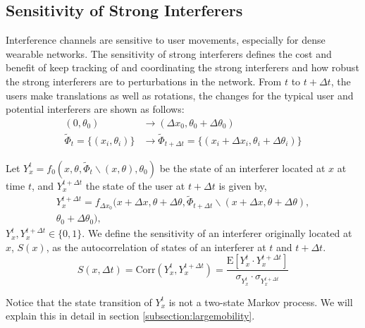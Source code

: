 \documentclass[10pt, conference, letterpaper]{IEEEtran}
\begin{document}
\subsection{Sensitivity of Strong Interferers}
Interference channels are sensitive to user movements, especially for dense wearable networks. The sensitivity of strong interferers defines the cost and benefit of keep tracking of and coordinating the strong interferers and how robust the strong interferers are to perturbations in the network. From $t$ to $t+\Delta t$, the users make translations as well as rotations, the changes for the typical user and potential interferers are shown as follows:
\begin{equation*}
\begin{split}
(0,\theta_0)&\rightarrow(\Delta x_0, \theta_0 + \Delta\theta_0) \\
\tilde{\Phi}_{t}=\{(x_i, \theta_i)\}&\rightarrow\tilde{\Phi}_{t+\Delta t}=\{(x_i+\Delta x_i, \theta_i + \Delta\theta_i)\}
\end{split}
\end{equation*}

Let $Y_x^t=f_0(x, \theta, \tilde{\Phi}_t\backslash (x, \theta), \theta_0)$ be the state of an interferer located at $x$ at time $t$, and $Y_x^{t+\Delta t}$ the state of the user at $t+\Delta t$ is given by,
\begin{multline*}
Y_{x}^{t+\Delta t} = f_{\Delta x_0}(x+\Delta x, \theta + \Delta\theta, \tilde{\Phi}_{t+\Delta t}\backslash (x+\Delta x, \theta + \Delta\theta), \\
\theta_0 + \Delta\theta_0),
\end{multline*}
$Y_x^t, Y_{x}^{t+\Delta t} \in \{0,1\}$.
We define the sensitivity of an interferer originally located at $x$, $S(x)$, as the autocorrelation of states of an interferer at $t$ and $t+\Delta t$. 
\begin{equation}
S(x, \Delta t)
=\mathrm{Corr}(Y_x^t, Y_x^{t+\Delta t})
=\frac{\mathrm{E}[Y_x^t\cdot Y_x^{t + \Delta t}]}{\sigma_{Y_x^t}\cdot \sigma_{Y_x^{t+\Delta t}}}
\end{equation} 

Notice that the state transition of $Y_x^t$ is not a two-state Markov process. We will explain this in detail in section \ref{subsection:largemobility}.
\end{document}
